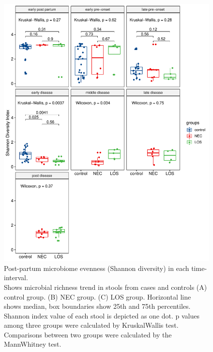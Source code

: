\documentclass[fleqn,10pt, lineno]{wlpeerj} %
\begin{document}
\begin{figure}[ht]\centering
  \includegraphics[width=\linewidth]{Shannon-time-groups.pdf}
  \caption{Post-partum microbiome evenness (Shannon diversity) in each time-interval. \\ Shows microbial richness trend in stools from cases and controls (A) control group. (B) NEC group. (C) LOS group. Horizontal line shows median, box boundaries show 25th and 75th percentiles.  Shannon index value of each stool is depicted as one dot. p values among three groups were calculated by Kruskal\-Wallis test. Comparisons between two groups were calculated by the Mann\-Whitney test. }
  \label{fig:Shannon-time-groups}
\end{figure}
\end{document}
